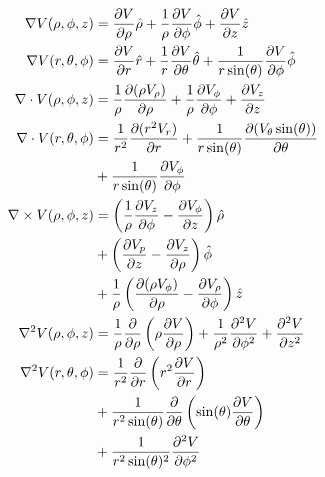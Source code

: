 \begin{align*}
	\nabla V(\rho,\phi,z) &=%
		\frac{\p V}{\p \rho}\hat{\rho} +%
		\frac{1}{\rho}\frac{\p V}{\p \phi}\hat{\phi} +%
		\frac{\p V}{\p z}\hat{z}\\
%
	\nabla V(r,\theta,\phi) &=%
		\frac{\p V}{\p r}\hat{r} +%
		\frac{1}{r}\frac{\p V}{\p \theta}\hat{\theta} +%
		\frac{1}{r\sin(\theta)}\frac{\p V}{\p \phi}\hat{\phi}\\
%
	\nabla \cdot V(\rho,\phi,z) &=%
		\frac{1}{\rho}\frac{\p (\rho V_{\rho})}{\p \rho} +%
		\frac{1}{\rho}\frac{\p V_{\phi}}{\p \phi} +%
		\frac{\p V_z}{\p z}\\
%
	\nabla \cdot V(r,\theta,\phi) &=%
		\frac{1}{r^2}\frac{\p(r^2 V_r)}{\p r} +%
		\frac{1}{r\sin(\theta)}\frac{\p(V_{\theta}\sin(\theta))}{\p \theta}\\%
		&+ \frac{1}{r\sin(\theta)}\frac{\p V_{\phi}}{\p \phi}\\%
%
	\nabla \times V(\rho,\phi,z) &=%
		\left( \frac{1}{\rho}\frac{\p V_z}{\p \phi} - \frac{\p V_{\phi}}{\p z} \right) \hat{\rho}\\%
		&+ \left( \frac{\p V_p}{\p z} - \frac{\p V_z}{\p \rho} \right) \hat{\phi}\\%
		&+ \frac{1}{\rho} \left( \frac{\p (\rho V_{\phi})}{\p \rho} - \frac{\p V_{\rho}}{\p \phi} \right) \hat{z}\\
%
	\nabla^2 V(\rho,\phi,z) &=%
		\frac{1}{\rho} \frac{\p}{\p \rho} \left( \rho \frac{\p V}{\p \rho} \right) +%
		\frac{1}{\rho^2} \frac{\p^2 V}{\p \phi^2} +%
		\frac{\p^2 V}{\p z^2} \\
%
	\nabla^2 V(r,\theta,\phi) &=%
		\frac{1}{r^2} \frac{\p}{\p r} \left( r^2 \frac{\p V}{\p r} \right)\\%
							  &+\frac{1}{r^2 \sin(\theta)} \frac{\p}{\p \theta} \left( \sin(\theta)\frac{\p V}{\p \theta} \right)\\%
							  &+\frac{1}{r^2 \sin(\theta)^2} \frac{\p^2 V}{\p \phi^2}
\end{align*}
